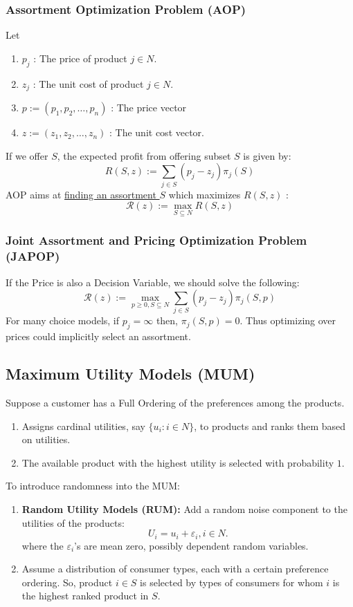 \documentclass[11pt,a4paper]{article}
\begin{document}
\subsubsection{Assortment Optimization Problem (AOP)}
Let
\begin{enumerate}[$\bullet$]
    \item $p_{j}$ : The price of product $j \in N$.
    \item $z_{j}$ : The unit cost of product $j \in N$.
    \item $p:=\left(p_{1}, p_{2}, \ldots, p_{n}\right)$ : The price vector
    \item $z:=\left(z_{1}, z_{2}, \ldots, z_{n}\right)$ : The unit cost vector.
\end{enumerate}
If we offer $S$, the expected profit from offering subset $S$ is given by:
$$
R(S, z):=\sum_{j \in S}\left(p_{j}-z_{j}\right) \pi_{j}(S)
$$
AOP aims at \underline{finding an assortment $S$} which maximizes $R(S, z)$ :
$$
\mathcal{R}(z):=\max _{S \subseteq N} R(S, z)
$$

\subsubsection{Joint Assortment and Pricing Optimization Problem (JAPOP)}
If the Price is also a Decision Variable, we should solve the following:
$$
\mathcal{R}(z):=\max _{p \geq 0, S\subseteq N} \sum_{j \in S}\left(p_{j}-z_{j}\right) \pi_{j}(S, p)
$$
For many choice models, if $p_{j}=\infty$ then, $\pi_{j}(S, p)=0$. Thus optimizing over prices could implicitly select an assortment.

\subsection{Maximum Utility Models (MUM)}
Suppose a customer has a Full Ordering of the preferences among the products.
\begin{enumerate}[$\bullet$]
    \item Assigns cardinal utilities, say $\{u_i : i \in N\}$, to products and ranks them based on utilities.
    \item The available product with the highest utility is selected with probability $1$.
\end{enumerate}

To introduce randomness into the MUM:
\begin{enumerate}
    \item \textbf{Random Utility Models (RUM):} Add a random noise component to the utilities of the products: $$U_i =u_i +\varepsilon_i,i \in N.$$
    where the $\varepsilon_i$'s are mean zero, possibly dependent random variables.
    \item Assume a distribution of consumer types, each with a certain preference ordering. So, product $i\in S$ is selected by types of consumers for whom $i$ is the highest ranked product in $S$.
\end{enumerate}
\end{document}
